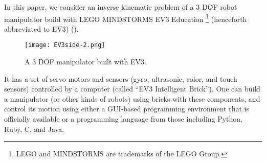 \documentclass{birkjour}
\theoremstyle{plain}
\theoremstyle{definition}
\begin{document}
    In this paper, we consider an inverse kinematic problem of a 3 DOF robot 
    manipulator build with 
    LEGO\textsuperscript{\textregistered}
    MINDSTORMS\textsuperscript{\textregistered} EV3 Education%
    \footnote{LEGO and MINDSTORMS are trademarks of the LEGO Group.}
     (henceforth abbreviated to EV3) ().
    \begin{figure}[t]
        \centering
        \texttt{[image: EV3side-2.png]}
        \caption{A 3 DOF manipulator built with EV3.}
        \label{fig:ev3-photo}
    \end{figure}
    It has a set of servo motors and sensors (gyro, ultrasonic, color, and touch sensors)
    controlled by a computer (called ``EV3 Intelligent Brick'').
    One can build a manipulator (or other kinds of robots) using bricks with these
    components, and control its motion using either a 
    GUI-based programming environment that is officially available
    or a programming language from those including Python, Ruby, C, and Java.
\end{document}
